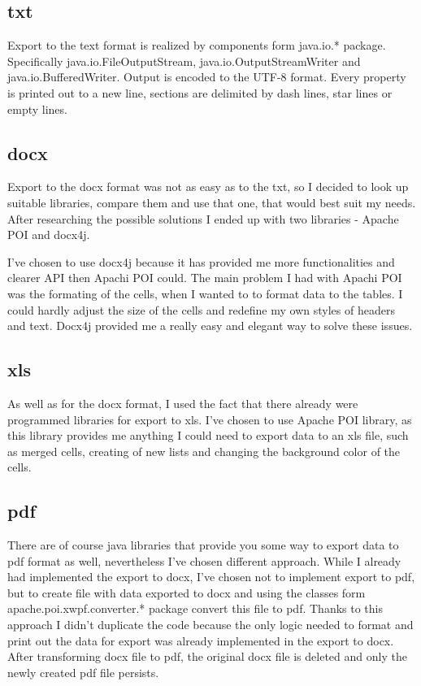\documentclass[thesis=B,english]{FITthesis}[2012/10/20]
\begin{document}
\subsection{txt}
Export to the text format is realized by components form java.io.* package. Specifically java.io.FileOutputStream, java.io.OutputStreamWriter and java.io.BufferedWriter. Output is encoded to the UTF-8 format. Every property is printed out to a new line, sections are delimited by dash lines, star lines or empty lines.
\subsection{docx}
Export to the docx format was not as easy as to the txt, so I decided to look up suitable libraries, compare them and use that one, that would best suit my needs. After researching the possible solutions I ended up with two libraries - Apache POI and docx4j.

I've chosen to use docx4j because it has provided me more functionalities and clearer API then Apachi POI could. The main problem I had with Apachi POI was the formating of the cells, when I wanted to to format data to the tables. I could hardly adjust the size of the cells and redefine my own styles of headers and text. Docx4j provided me a really easy and elegant way to solve these issues.
\subsection{xls}
As well as for the docx format, I used the fact that there already were programmed libraries for export to xls.
I've chosen to use Apache POI library, as this library provides me anything I could need to export data to an xls file, such as merged cells, creating of new lists and changing the background color of the cells.
\subsection{pdf}
There are of course java libraries that provide you some way to export data to pdf format as well, nevertheless I've chosen different approach. While I already had implemented the export to docx, I've chosen not to implement export to pdf, but to create file with data exported to docx and using the classes form apache.poi.xwpf.converter.* package convert this file to pdf. Thanks to this approach I didn't duplicate the code because the only logic needed to format and print out the data for export was already implemented in the export to docx. After transforming docx file to pdf, the original docx file is deleted and only the newly created pdf file persists.
\end{document}
